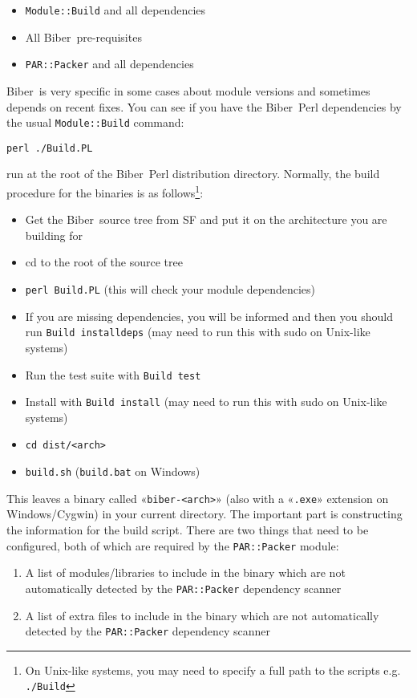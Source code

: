 \documentclass{ltxdockit}
\newcommand*{\biber}{Biber\xspace}
\begin{document}
\begin{itemize}
\item \verb+Module::Build+ and all dependencies
\item All \biber\ pre-requisites
\item \verb+PAR::Packer+ and all dependencies
\end{itemize}

\noindent \biber\ is very specific in some cases about module versions and
sometimes depends on recent fixes. You can see if you have the
\biber\ Perl dependencies by the usual \verb+Module::Build+ command:

\begin{verbatim}
perl ./Build.PL
\end{verbatim}

\noindent run at the root of the \biber\ Perl distribution
directory. Normally, the build procedure for the binaries is as
follows\footnote{On Unix-like systems, you may need to specify a full
  path to the scripts e.g. \texttt{./Build}}:

\begin{itemize}
\item Get the \biber\ source tree from SF and put it on the architecture
  you are building for
\item cd to the root of the source tree
\item \verb+perl Build.PL+ (this will check your module dependencies)
\item If you are missing dependencies, you will be informed and then you
  should run \verb+Build installdeps+ (may need to run this with sudo on
  Unix-like systems)
\item Run the test suite with \verb+Build test+
\item Install with \verb+Build install+ (may need to run this with sudo on
  Unix-like systems)
\item \verb+cd dist/<arch>+
\item \verb+build.sh+ (\verb+build.bat+ on Windows)
\end{itemize}

\noindent This leaves a binary called «\verb+biber-<arch>+» (also with
a «\verb+.exe+» extension on Windows/Cygwin) in your current directory.
The important part is constructing the information for the build
script. There are two things that need to be configured, both of
which are required by the \verb+PAR::Packer+ module:

\begin{enumerate}
\item A list of modules/libraries to include in the binary which are not
  automatically detected by the \verb+PAR::Packer+ dependency
  scanner
\item A list of extra files to include in the binary which are not
  automatically detected by the \verb+PAR::Packer+ dependency
  scanner
\end{enumerate}
\end{document}
